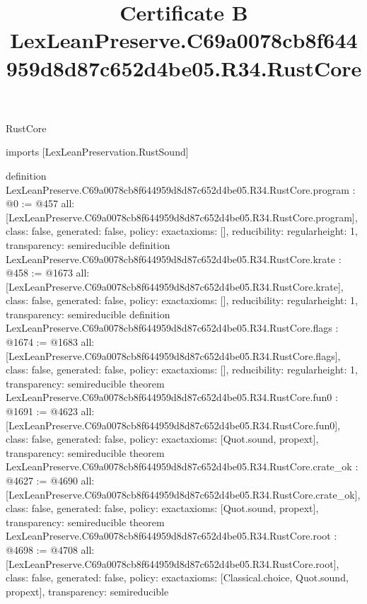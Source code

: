 \begin{lexlean}{RustCore}
\title{Certificate B LexLeanPreserve.C69a0078cb8f644959d8d87c652d4be05.R34.RustCore}
\begin{coremodule}
imports [LexLeanPreservation.RustSound]

definition LexLeanPreserve.C69a0078cb8f644959d8d87c652d4be05.R34.RustCore.program : @0 := @457 {
  all: [LexLeanPreserve.C69a0078cb8f644959d8d87c652d4be05.R34.RustCore.program],
  class: false,
  generated: false,
  policy: exact{axioms: []},
  reducibility: regular{height: 1},
  transparency: semireducible
}
definition LexLeanPreserve.C69a0078cb8f644959d8d87c652d4be05.R34.RustCore.krate : @458 := @1673 {
  all: [LexLeanPreserve.C69a0078cb8f644959d8d87c652d4be05.R34.RustCore.krate],
  class: false,
  generated: false,
  policy: exact{axioms: []},
  reducibility: regular{height: 1},
  transparency: semireducible
}
definition LexLeanPreserve.C69a0078cb8f644959d8d87c652d4be05.R34.RustCore.flags : @1674 := @1683 {
  all: [LexLeanPreserve.C69a0078cb8f644959d8d87c652d4be05.R34.RustCore.flags],
  class: false,
  generated: false,
  policy: exact{axioms: []},
  reducibility: regular{height: 1},
  transparency: semireducible
}
theorem LexLeanPreserve.C69a0078cb8f644959d8d87c652d4be05.R34.RustCore.fun0 : @1691 := @4623 {
  all: [LexLeanPreserve.C69a0078cb8f644959d8d87c652d4be05.R34.RustCore.fun0],
  class: false,
  generated: false,
  policy: exact{axioms: [Quot.sound, propext]},
  transparency: semireducible
}
theorem LexLeanPreserve.C69a0078cb8f644959d8d87c652d4be05.R34.RustCore.crate_ok : @4627 := @4690 {
  all: [LexLeanPreserve.C69a0078cb8f644959d8d87c652d4be05.R34.RustCore.crate_ok],
  class: false,
  generated: false,
  policy: exact{axioms: [Quot.sound, propext]},
  transparency: semireducible
}
theorem LexLeanPreserve.C69a0078cb8f644959d8d87c652d4be05.R34.RustCore.root : @4698 := @4708 {
  all: [LexLeanPreserve.C69a0078cb8f644959d8d87c652d4be05.R34.RustCore.root],
  class: false,
  generated: false,
  policy: exact{axioms: [Classical.choice, Quot.sound, propext]},
  transparency: semireducible
}


\end{coremodule}
\end{lexlean}

